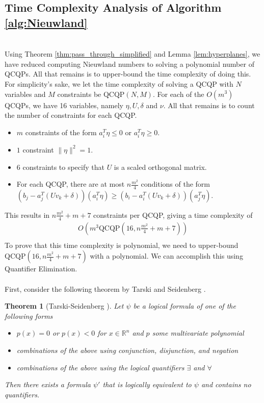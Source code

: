 \documentclass[a4paper]{amsart}
\newtheorem{thm}{Theorem}
\theoremstyle{remark}
\begin{document}
\subsection{Time Complexity Analysis of Algorithm \ref{alg:Nieuwland}}\label{subsec:time_complexity}
\hfill \\
Using Theorem \ref{thm:pass_through_simplified} and Lemma \ref{lem:hyperplanes}, we have reduced computing Nieuwland numbers to solving a polynomial number of QCQPs. All that remains is to upper-bound the time complexity of doing this. For simplicity's sake, we let the time complexity of solving a QCQP with $N$ variables and $M$ constraints be $\textrm{QCQP}(N,M)$. For each of the $O(m^3)$ QCQPs, we have 16 variables, namely $\eta, U, \delta$ and $\nu$. All that remains is to count the number of constraints for each QCQP.
\begin{itemize}
	\item $m$ constraints of the form $a_i^T\eta \leq 0$ or $a_i^T\eta \geq 0$.
	\item $1$ constraint $\lVert \eta \rVert^2=1$.
	\item $6$ constraints to specify that $U$ is a scaled orthogonal matrix.
	\item For each QCQP, there are at most $n\frac{m^2}{4}$ conditions of the form $(b_j-a_j^T(U v_k+\delta))(a_i^T\eta) \geq (b_i-a_i^T(U v_k+\delta))(a_j^T\eta)$.
\end{itemize}
This results in $n\frac{m^2}{4}+m+7$ constraints per QCQP, giving a time complexity of
\begin{align*}
	O \left(m^3 \textrm{QCQP}\left(16,n\frac{m^2}{4}+m+7\right) \right) \\
\end{align*}
To prove that this time complexity is polynomial, we need to upper-bound $\textrm{QCQP}\left(16,n\frac{m^2}{4}+m+7\right)$ with a polynomial. We can accomplish this using Quantifier Elimination.\\\\
First, consider the following theorem by Tarski and Seidenberg \cite{Re92}. 
\begin{thm}[Tarski-Seidenberg \cite{Re92}]
    Let $\psi$ be a logical formula of one of the following forms
    \begin{itemize}
    	\item $p(x) = 0$ or $p(x) < 0$ for $x \in \mathbb{R}^n$ and $p$ some multivariate polynomial
    	\item combinations of the above using conjunction, disjunction, and negation
    	\item combinations of the above using the logical quantifiers $\exists$ and $\forall$
    \end{itemize}
    Then there exists a formula $\psi'$ that is logically equivalent to $\psi$ and contains no quantifiers.
\end{thm}
\end{document}
